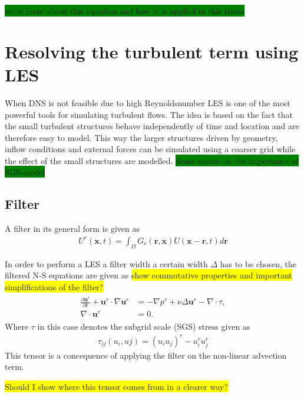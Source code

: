 \colorbox{green}{write more about this equation and how it is applied in this thesis}
\section{Resolving the turbulent term using LES}
When DNS is not feasible due to high Reynoldsnumber LES is one of the most powerful tools for simulating turbulent flows.
The idea is based on the fact that the small turbulent structures behave independently of time and location and are therefore 
easy to model. This way the larger structures driven by geometry, inflow conditions and external forces can be simulated using a coarser 
grid while the effect of the small structures are modelled. \colorbox{green}{Some source on the importance of SGS-model}

\subsection{Filter}
A filter in its general form is given as 
\begin{align}
    U^r(\mathbf{x},t) = \int_{\Omega} G_r(\mathbf{r},\mathbf{x})U(\mathbf{x}-\mathbf{r},t)d\mathbf{r}
    \label{eq:filter}
\end{align}

In order to perform a LES a filter width a certain width $\Delta$ has to be chosen, 
the filtered N-S equations are given as 
\colorbox{yellow}{show commutative properties and important simplifications of the filter?}
%
\begin{align}
    \begin{split}
        \frac{\partial \mathbf{u}^r}{\partial t} + \mathbf{u}^r\cdot \nabla\mathbf{u}^r
        &= -\nabla p^r +\nu\Delta \mathbf{u}^r-\nabla \cdot \tau, \\
        \nabla \cdot \mathbf{u}^r &= 0.
    \end{split}
	\label{eq:NSfiltered}
\end{align}
%
Where $\tau$ in this case denotes the subgrid scale (SGS) stress given as 
\begin{align}
    \tau_{ij}(u_i,uj) = (u_iu_j)^r -u_i^ru_j^r
    \label{eq:sgstensor}
\end{align}
%
This tensor is a concequence of applying the filter on the non-linear advection term.

\colorbox{yellow}{Should I show where this tensor comes from in a clearer way?}

